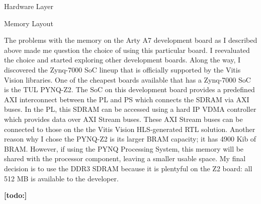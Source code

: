 \documentclass{matthijs}
\begin{document}
\begin{hoofdstuk}{Hardware Layer}
\begin{paragraaf}{Memory Layout}
			\bigskip

			The problems with the memory on the Arty A7 development board as I described above made me question the choice of using this particular board.
			I reevaluated the choice and started exploring other development boards.
			Along the way, I discovered the Zynq-7000 SoC lineup that is officially supported by the Vitis Vision libraries.
			One of the cheapest boards available that has a Zynq-7000 SoC is the TUL PYNQ-Z2.
			The SoC on this development board provides a predefined AXI interconnect between the PL and PS which connects the SDRAM via AXI buses.
			In the PL, this SDRAM can be accessed using a hard IP VDMA controller which provides data over AXI Stream buses.
			These AXI Stream buses can be connected to those on the the Vitis Vision HLS-generated RTL solution.
			Another reason why I chose the PYNQ-Z2 is its larger BRAM capacity; it has 4900 Kib of BRAM.
			However, if using the PYNQ Processing System, this memory will be shared with the processor component, leaving a smaller usable space.
			My final decision is to use the DDR3 SDRAM because it is plentyful on the Z2 board: all 512 MB is available to the developer.

		\end{paragraaf}

		\textbf{[todo:]}

	\end{hoofdstuk}
\end{document}
